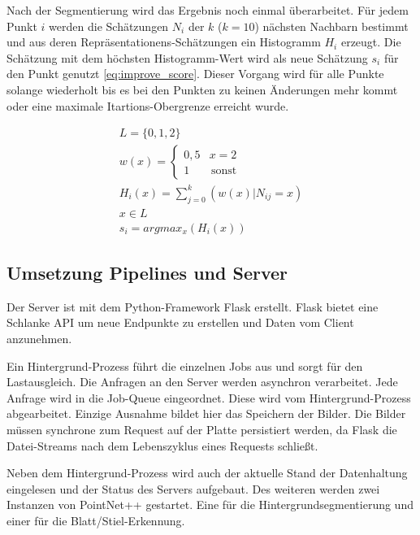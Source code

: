 \documentclass[12pt,titlepage, twoside]{article}
\begin{document}
Nach der Segmentierung wird das Ergebnis noch einmal überarbeitet. Für jedem Punkt $i$ werden die Schätzungen $N_i$ der $k$ ($k=10$) nächsten Nachbarn bestimmt und aus deren Repräsentationens-Schätzungen ein Histogramm $H_i$ erzeugt. 
Die Schätzung mit dem höchsten Histogramm-Wert wird als neue Schätzung $s_i$ für den Punkt genutzt \ref{eq:improve_score}. Dieser Vorgang wird für alle Punkte solange wiederholt bis es bei den Punkten zu keinen Änderungen mehr kommt oder eine maximale Itartions-Obergrenze erreicht wurde.

\begin{equation}
\label{eq:improve_score}
\begin{array}{l}
L =  \{0,1,2\}\\
w(x) = \left\{
\begin{array}{ll}
0,5 & x = 2 \\
1 & \, \textrm{sonst} 
\end{array}
\right.\\ 
H_i(x) = \sum_{j=0}^{k}{(w(x) | N_{ij} = x)}\\
x \in L\\
s_i = argmax_x(H_i(x))
\end{array}
\end{equation}

\subsection{Umsetzung Pipelines und Server}
\label{sec:realisierung:implementierung4}

Der Server ist mit dem Python-Framework Flask erstellt. Flask bietet eine Schlanke API um neue Endpunkte zu erstellen und Daten vom Client anzunehmen. 

Ein Hintergrund-Prozess führt die einzelnen Jobs aus und sorgt für den Lastausgleich. Die Anfragen an den Server werden asynchron verarbeitet. Jede Anfrage wird in die Job-Queue eingeordnet. Diese wird vom Hintergrund-Prozess abgearbeitet.
Einzige Ausnahme bildet hier das Speichern der Bilder. Die Bilder müssen synchrone zum Request auf der Platte persistiert werden, da Flask die Datei-Streams nach dem Lebenszyklus eines Requests schließt.

Neben dem Hintergrund-Prozess wird auch der aktuelle Stand der Datenhaltung eingelesen und der Status des Servers aufgebaut. Des weiteren werden zwei Instanzen von PointNet++ gestartet. 
Eine für die Hintergrundsegmentierung und einer für die Blatt/Stiel-Erkennung.
\end{document}
